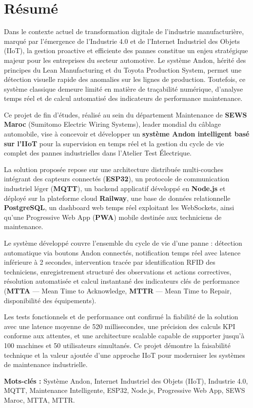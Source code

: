 ﻿%
\chapter*{Résumé}

Dans le contexte actuel de transformation digitale de l'industrie manufacturière, marqué par l'émergence de l'Industrie 4.0 et de l'Internet Industriel des Objets (IIoT), la gestion proactive et efficiente des pannes constitue un enjeu stratégique majeur pour les entreprises du secteur automotive. Le système Andon, hérité des principes du Lean Manufacturing et du Toyota Production System, permet une détection visuelle rapide des anomalies sur les lignes de production. Toutefois, ce système classique demeure limité en matière de traçabilité numérique, d'analyse temps réel et de calcul automatisé des indicateurs de performance maintenance.

Ce projet de fin d'études, réalisé au sein du département Maintenance de \textbf{SEWS Maroc} (Sumitomo Electric Wiring Systems), leader mondial du câblage automobile, vise à concevoir et développer un \textbf{système Andon intelligent basé sur l'IIoT} pour la supervision en temps réel et la gestion du cycle de vie complet des pannes industrielles dans l'Atelier Test Électrique.

La solution proposée repose sur une architecture distribuée multi-couches intégrant des capteurs connectés (\textbf{ESP32}), un protocole de communication industriel léger (\textbf{MQTT}), un backend applicatif développé en \textbf{Node.js} et déployé sur la plateforme cloud \textbf{Railway}, une base de données relationnelle \textbf{PostgreSQL}, un dashboard web temps réel exploitant les WebSockets, ainsi qu'une Progressive Web App (\textbf{PWA}) mobile destinée aux techniciens de maintenance.

Le système développé couvre l'ensemble du cycle de vie d'une panne : détection automatique via boutons Andon connectés, notification temps réel avec latence inférieure à 2 secondes, intervention tracée par identification RFID des techniciens, enregistrement structuré des observations et actions correctives, résolution automatisée et calcul instantané des indicateurs clés de performance (\textbf{MTTA} --- Mean Time to Acknowledge, \textbf{MTTR} --- Mean Time to Repair, disponibilité des équipements).

Les tests fonctionnels et de performance ont confirmé la fiabilité de la solution avec une latence moyenne de 520 millisecondes, une précision des calculs KPI conforme aux attentes, et une architecture scalable capable de supporter jusqu'à 100 machines et 50 utilisateurs simultanés. Ce projet démontre la faisabilité technique et la valeur ajoutée d'une approche IIoT pour moderniser les systèmes de maintenance industrielle.

\vspace{0.5cm}
\noindent\textbf{Mots-clés :} Système Andon, Internet Industriel des Objets (IIoT), Industrie 4.0, MQTT, Maintenance Intelligente, ESP32, Node.js, Progressive Web App, SEWS Maroc, MTTA, MTTR.
\clearpage
